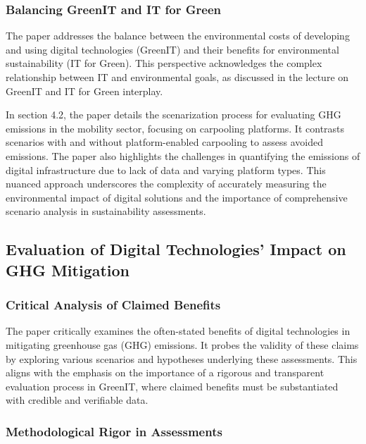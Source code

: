 \documentclass[conference,compsoc]{IEEEtran}
\begin{document}
\subsubsection{Balancing GreenIT and IT for Green}

The paper addresses the balance between the environmental costs of developing and using digital technologies (GreenIT) and their benefits for environmental sustainability (IT for Green). This perspective acknowledges the complex relationship between IT and environmental goals, as discussed in the lecture on GreenIT and IT for Green interplay.

In section 4.2, the paper details the scenarization process for evaluating GHG emissions in the mobility sector, focusing on carpooling platforms. It contrasts scenarios with and without platform-enabled carpooling to assess avoided emissions. The paper also highlights the challenges in quantifying the emissions of digital infrastructure due to lack of data and varying platform types. This nuanced approach underscores the complexity of accurately measuring the environmental impact of digital solutions and the importance of comprehensive scenario analysis in sustainability assessments.

\subsection{Evaluation of Digital Technologies' Impact on GHG Mitigation}

\subsubsection{Critical Analysis of Claimed Benefits}

The paper critically examines the often-stated benefits of digital technologies in mitigating greenhouse gas (GHG) emissions. It probes the validity of these claims by exploring various scenarios and hypotheses underlying these assessments. This aligns with the  emphasis on the importance of a rigorous and transparent evaluation process in GreenIT, where claimed benefits must be substantiated with credible and verifiable data.

\subsubsection{Methodological Rigor in Assessments}
\end{document}
